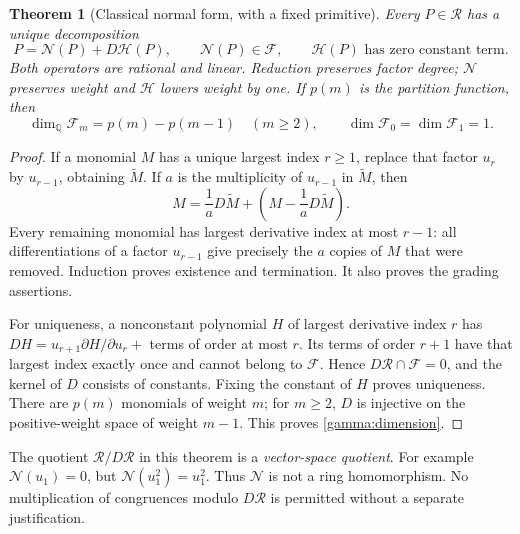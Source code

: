 \documentclass[11pt,a4paper]{article}
\numberwithin{equation}{section}
\newtheorem{theorem}{Theorem}[section]
\theoremstyle{definition}
\theoremstyle{remark}
\newcommand{\Q}{\mathbb Q}
\newcommand{\NN}{\mathcal N}
\newcommand{\HH}{\mathcal H}
\begin{document}
\begin{theorem}[Classical normal form, with a fixed primitive]
\label{gamma:normal}
Every $P\in\mathscr R$ has a unique decomposition
\begin{equation}\label{gamma:decomp}
 P=\NN(P)+D\HH(P),\qquad \NN(P)\in\mathscr F,
 \qquad \HH(P)\text{ has zero constant term}.
\end{equation}
Both operators are rational and linear.  Reduction preserves factor
degree; $\NN$ preserves weight and $\HH$ lowers weight by one.
If $p(m)$ is the partition function, then
\begin{equation}\label{gamma:dimension}
 \dim_\Q\mathscr F_m=p(m)-p(m-1)\quad(m\ge2),
 \qquad \dim\mathscr F_0=\dim\mathscr F_1=1.
\end{equation}
\end{theorem}
\begin{proof}
If a monomial $M$ has a unique largest index $r\ge1$, replace that
factor $u_r$ by $u_{r-1}$, obtaining $\widetilde M$.
If $a$ is the multiplicity of $u_{r-1}$ in $\widetilde M$, then
\[
 M=\frac1aD\widetilde M+
      \left(M-\frac1aD\widetilde M\right).
\]
Every remaining monomial has largest derivative index at most $r-1$:
all differentiations of a factor $u_{r-1}$ give precisely the $a$
copies of $M$ that were removed.  Induction proves existence and
termination.  It also proves the grading assertions.

For uniqueness, a nonconstant polynomial $H$ of largest derivative
index $r$ has
$DH=u_{r+1}\partial H/\partial u_r+$ terms of order at most $r$.
Its terms of order $r+1$ have that largest index exactly once and
cannot belong to $\mathscr F$.  Hence $D\mathscr R\cap\mathscr F=0$,
and the kernel of $D$ consists of constants.  Fixing the constant of
$H$ proves uniqueness.  There are $p(m)$ monomials of weight $m$;
for $m\ge2$, $D$ is injective on the positive-weight space of weight
$m-1$.  This proves \eqref{gamma:dimension}.
\end{proof}

The quotient $\mathscr R/D\mathscr R$ in this theorem is a
\emph{vector-space quotient}.  For example $\NN(u_1)=0$, but
$\NN(u_1^2)=u_1^2$.  Thus $\NN$ is not a ring homomorphism.
No multiplication of congruences modulo $D\mathscr R$ is permitted
without a separate justification.
\end{document}
